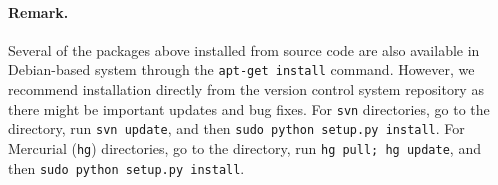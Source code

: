 \documentclass[twoside]{article}
\begin{document}
\paragraph{Remark.}
Several of the packages above installed from source code
are also available in Debian-based system through the
{\fontsize{10pt}{10pt}\verb!apt-get install!} command. However, we recommend installation directly
from the version control system repository as there might be important
updates and bug fixes. For {\fontsize{10pt}{10pt}\verb!svn!} directories, go to the directory,
run {\fontsize{10pt}{10pt}\verb!svn update!}, and then {\fontsize{10pt}{10pt}\verb!sudo python setup.py install!}. For
Mercurial ({\fontsize{10pt}{10pt}\verb!hg!}) directories, go to the directory, run
{\fontsize{10pt}{10pt}\verb!hg pull; hg update!}, and then {\fontsize{10pt}{10pt}\verb!sudo python setup.py install!}.

\printindex
\end{document}

